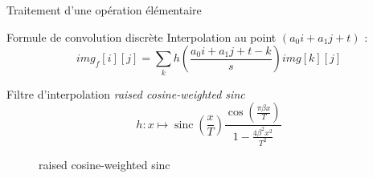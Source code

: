 \documentclass[c,12pt]{beamer}
\DeclareMathOperator{\sinc}{sinc}
\begin{document}
\begin{frame}{Traitement d'une opération élémentaire}


\begin{block}{Formule de convolution discrète}
Interpolation au point $ (a_0i+a_1j+t)$ :
	\begin{equation*}
	img_f[i][j] = \displaystyle{\sum_k}h\left(\frac{a_0i+a_1j+t-k}{s}\right)img[k][j]
	\label{formule_convolution_discrete}
	\end{equation*}

\end{block}


\begin{block}{Filtre d'interpolation }
	 \emph{raised cosine-weighted sinc}
	\begin{equation*}
	h : x \mapsto \sinc(\frac{x}{T})\frac{\cos(\frac{\pi\beta x}{T})}{1-\frac{4\beta^2x^2}{T^2}}
	\label{szeliski_definition_raisedCosineWeightedSinc}
	\end{equation*}
\end{block}

\end{frame}

\begin{figure}
\centering
{}
\caption{raised cosine-weighted sinc}
\end{figure}
\end{document}
